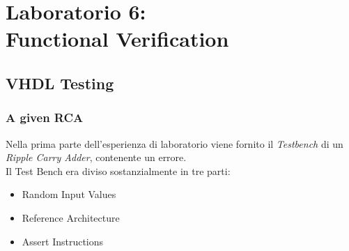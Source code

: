 \chapter{Laboratorio 6: \\Functional Verification}
\section{VHDL Testing}
\subsection{A given RCA}
Nella prima parte dell'esperienza di laboratorio viene fornito il \textit{Testbench} di un \textit{Ripple Carry Adder}, contenente un errore.\\
Il Test Bench era diviso sostanzialmente in tre parti:
\begin{itemize}
	\item{Random Input Values}
	\item{Reference Architecture}
	\item{Assert Instructions}
\end{itemize}
